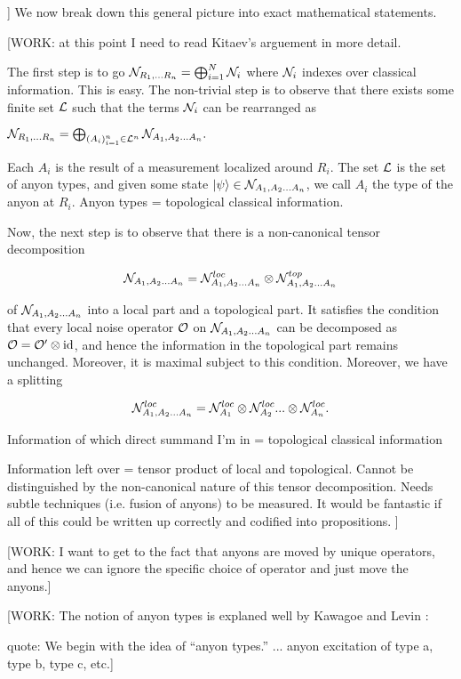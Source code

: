 ]
We now break down this general picture into exact mathematical statements.

[WORK: at this point I need to read Kitaev's arguement in more detail.

The first step is to go $\mathcal{N}_{R_1,... R_n}=\bigoplus_{i=1}^{N}\mathcal{N}_{i}$ where $\mathcal{N}_i$ indexes over classical information. This is easy. The non-trivial step is to observe that there exists some finite set $\mathcal{L}$ such that the terms $\mathcal{N}_i$ can be rearranged as 

$\mathcal{N}_{R_1,... R_n}=\bigoplus_{(A_i)_{i=1}^n\in \mathcal{L}^n}\mathcal{N}_{A_1,A_2... A_n}.$

Each $A_i$ is the result of a measurement localized around $R_i$. The set $\mathcal{L}$ is the set of anyon types, and given some state $\ket{\psi}\in \mathcal{N}_{A_1,A_2... A_n}$, we call $A_i$ the type of the anyon at $R_i$. Anyon types = topological classical information.

Now, the next step is to observe that there is a non-canonical tensor decomposition


$$
\mathcal{N}_{A_1,A_2... A_n}=\mathcal{N}^{loc}_{A_1,A_2... A_n}\otimes \mathcal{N}^{top}_{A_1,A_2... A_n}
$$

of $\mathcal{N}_{A_1,A_2... A_n}$ into a local part and a topological part. It satisfies the condition that every local noise operator $\mathcal{O}$ on $\mathcal{N}_{A_1,A_2... A_n}$ can be decomposed as $\mathcal{O}=\mathcal{O}'\otimes \operatorname{id}$, and hence the information in the topological part remains unchanged. Moreover, it is maximal subject to this condition. Moreover, we have a splitting

$$\mathcal{N}^{loc}_{A_1,A_2... A_n}=\mathcal{N}^{loc}_{A_1}\otimes \mathcal{N}^{loc}_{A_2}...\otimes \mathcal{N}^{loc}_{A_n}.$$


Information of which direct summand I'm in = topological classical information

Information left over = tensor product of local and topological. Cannot be distinguished by the non-canonical nature of this tensor decomposition. Needs subtle techniques (i.e. fusion of anyons) to be measured. It would be fantastic if all of this could be written up correctly and codified into propositions.
]


[WORK: I want to get to the fact that anyons are moved by unique operators, and hence we can ignore the specific choice of operator and just move the anyons.]

[WORK: The notion of anyon types is explaned well by Kawagoe and Levin \cite{kawagoe2020microscopic}:

quote: We begin with the idea of “anyon types.” ... anyon excitation of type a, type b,
type c, etc.]

